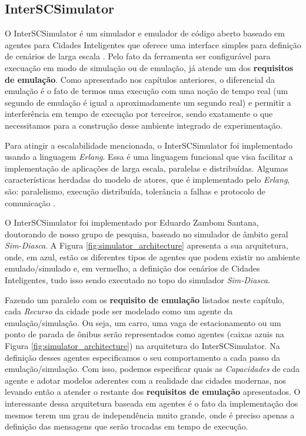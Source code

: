 \subsection{InterSCSimulator}

O InterSCSimulator é um simulador e emulador de código aberto baseado em agentes para Cidades Inteligentes que oferece uma interface simples para definição de
cenários de larga escala \cite{santana_17}.
Pelo fato da ferramenta ser configurável para execuação em modo de simulação ou de emulação, já atende um dos \textbf{requisitos de emulação}.
Como apresentado nos capítulos anteriores, o diferencial da emulação é o fato de termos uma execução com uma noção de tempo real (um segundo de emulação é igual a
aproximadamente um segundo real) e permitir a interferência em tempo de execução por terceiros, sendo exatamente o que necessitamos para a construção desse
ambiente integrado de experimentação.

Para atingir a escalabilidade mencionada, o InterSCSimulator foi implementado usando a linguagem \textit{Erlang}.
Essa é uma linguagem funcional que visa facilitar a implementação de aplicações de larga escala, paralelas e distribuídas.
Algumas características herdadas do modelo de atores, que é implementado pelo \textit{Erlang}, são: paralelismo, execução distribuída, tolerância a falhas e
protocolo de comunicação \cite{santana_17}.

O InterSCSimulator foi implementado por Eduardo Zambom Santana, doutorando de nosso grupo de pesquisa, baseado no simulador de âmbito geral \textit{Sim-Diasca}.
A Figura \ref{fig:simulator_architecture} apresenta a sua arquitetura, onde, em azul, estão os diferentes tipos de agentes que podem existir no ambiente
emulado/simulado e, em vermelho, a definição dos cenários de Cidades Inteligentes, tudo isso sendo executado no topo do simulador \textit{Sim-Diasca}.


Fazendo um paralelo com os \textbf{requisito de emulação} listados neste capítulo, cada \textit{Recurso} da cidade pode ser modelado como um agente da emulação/simulação.
Ou seja, um carro, uma vaga de estacionamento ou um ponto de parada de ônibus serão representados como agentes (caixas azuis na Figura \ref{fig:simulator_architecture})
na arquitetura do InterSCSimulator.
Na definição desses agentes especificamos o seu comportamento a cada passo da emulação/simulação.
Com isso, podemos especificar quais as \textit{Capacidades} de cada agente e adotar modelos aderentes com a realidade das cidades modernas, nos levando então a atender
o restante dos \textbf{requisitos de emulação} apresentados.
O interessante dessa arquitetura baseada em agentes é o fato da implementação dos mesmos terem um grau de independência muito grande, onde é preciso apenas a definição
das mensagens que serão trocadas em tempo de execução.

